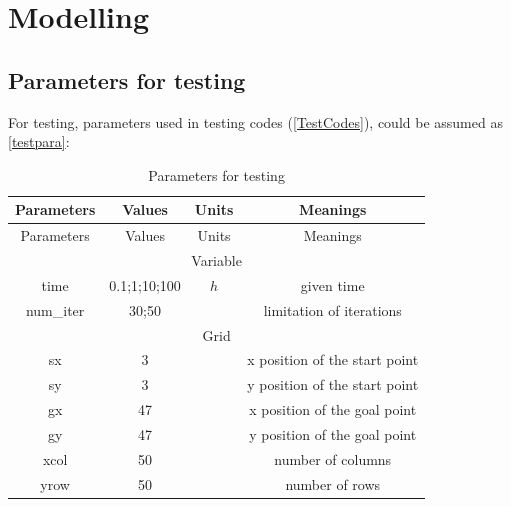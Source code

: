 \chapter{Modelling}
\section{Parameters for testing}
For testing, parameters used in testing codes (\autoref{TestCodes}), could be assumed as \autoref{testpara}:
\begin{center}
    \begin{longtable}{cccc}
        \caption{Parameters for testing}
        \label{testpara} \\
            \hline
            Parameters & Values     & Units                   & Meanings   \\
            \hline
            \endfirsthead
            \hline
            Parameters & Values     & Units                   & Meanings   \\
            \hline
            \endhead
            \cline{1-4}
            \multicolumn{4}{c}{Variable}                                                                                \\
            \cline{1-4}
            time       &0.1;1;10;100        & $h$                       & given time \\
            num\_iter  & 30;50         &                         & limitation of   iterations                                    \\
            \cline{1-4}
            \multicolumn{4}{c}{Grid} \\
            \cline{1-4}
            sx         & 3          &                         & x position of the   start point                               \\
            sy         & 3          &                         & y position of the   start point                               \\
            gx         & 47         &                         & x position of the   goal point                                \\
            gy         & 47         &                         & y position of the   goal point                                \\
            xcol       & 50         &                         & number of columns                                             \\
            yrow       & 50         &                         & number of rows                                                \\

\end{longtable}
\end{center}
